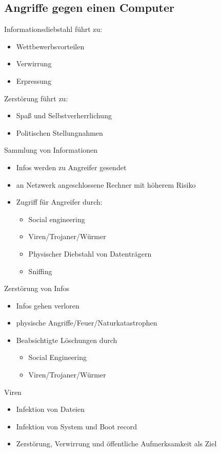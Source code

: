 \documentclass{article} %
\begin{document}
\subsection{Angriffe gegen einen Computer}
Informationsdiebstahl führt zu:
\begin{itemize}
	\item Wettbewerbsvorteilen
    \item Verwirrung
    \item Erpressung
    
\end{itemize}
Zerstörung führt zu:
\begin{itemize}
	\item Spaß und Selbstverherrlichung
    \item Politischen Stellungnahmen
\end{itemize}
Sammlung von Informationen
\begin{itemize}
	\item Infos werden zu Angreifer gesendet
    \item an Netzwerk angeschlossene Rechner mit höherem Risiko
    \item Zugriff für Angreifer durch:
    
    \begin{itemize}
        \item Social engineering
        \item Viren/Trojaner/Würmer
        \item Physischer Diebstahl von Datenträgern
        \item Sniffing
    \end{itemize}
    
\end{itemize}
Zerstörung von Infos
\begin{itemize}
	\item Infos gehen verloren
    \item physische Angriffe/Feuer/Naturkatastrophen
    \item Beabsichtigte Löschungen durch 
    
    \begin{itemize}
        \item Social Engineering
        \item Viren/Trojaner/Würmer
    \end{itemize}
\end{itemize}
Viren
\begin{itemize}
	\item Infektion von Dateien 
    \item Infektion von System und Boot record
    \item Zerstörung, Verwirrung und öffentliche Aufmerksamkeit als Ziel
\end{itemize}
\end{document}
